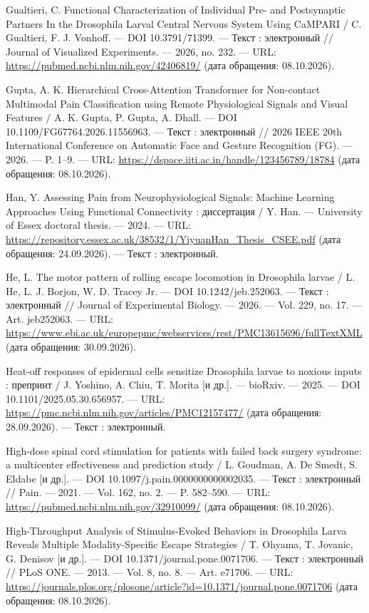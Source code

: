 \begin{list}{}{\setlength{\leftmargin}{10mm}\setlength{\labelwidth}{8mm}\setlength{\labelsep}{2mm}\setlength{\itemsep}{0pt}\setlength{\parsep}{0pt}\setlength{\topsep}{0pt}}
\item[143.] Gualtieri, C. Functional Characterization of Individual Pre- and Postsynaptic Partners In the Drosophila Larval Central Nervous System Using CaMPARI / C. Gualtieri, F. J. Vonhoff. — DOI 10.3791/71399. — Текст : электронный // Journal of Visualized Experiments. — 2026, no. 232. — URL: \url{https://pubmed.ncbi.nlm.nih.gov/42406819/} (дата обращения: 08.10.2026).
\item[144.] Gupta, A. K. Hierarchical Cross-Attention Transformer for Non-contact Multimodal Pain Classification using Remote Physiological Signals and Visual Features / A. K. Gupta, P. Gupta, A. Dhall. — DOI 10.1109/FG67764.2026.11556963. — Текст : электронный // 2026 IEEE 20th International Conference on Automatic Face and Gesture Recognition (FG). — 2026. — P. 1–9. — URL: \url{https://dspace.iiti.ac.in/handle/123456789/18784} (дата обращения: 08.10.2026).
\item[145.] Han, Y. Assessing Pain from Neurophysiological Signals: Machine Learning Approaches Using Functional Connectivity : диссертация / Y. Han. — University of Essex doctoral thesis. — 2024. — URL: \url{https://repository.essex.ac.uk/38532/1/YiyuanHan\_Thesis\_CSEE.pdf} (дата обращения: 24.09.2026). — Текст : электронный.
\item[146.] He, L. The motor pattern of rolling escape locomotion in Drosophila larvae / L. He, L. J. Borjon, W. D. Tracey Jr. — DOI 10.1242/jeb.252063. — Текст : электронный // Journal of Experimental Biology. — 2026. — Vol. 229, no. 17. — Art. jeb252063. — URL: \url{https://www.ebi.ac.uk/europepmc/webservices/rest/PMC13615696/fullTextXML} (дата обращения: 30.09.2026).
\item[147.] Heat-off responses of epidermal cells sensitize Drosophila larvae to noxious inputs : препринт / J. Yoshino, A. Chiu, T. Morita [и др.]. — bioRxiv. — 2025. — DOI 10.1101/2025.05.30.656957. — URL: \url{https://pmc.ncbi.nlm.nih.gov/articles/PMC12157477/} (дата обращения: 28.09.2026). — Текст : электронный.
\item[148.] High-dose spinal cord stimulation for patients with failed back surgery syndrome: a multicenter effectiveness and prediction study / L. Goudman, A. De Smedt, S. Eldabe [и др.]. — DOI 10.1097/j.pain.0000000000002035. — Текст : электронный // Pain. — 2021. — Vol. 162, no. 2. — P. 582–590. — URL: \url{https://pubmed.ncbi.nlm.nih.gov/32910099/} (дата обращения: 08.10.2026).
\item[149.] High-Throughput Analysis of Stimulus-Evoked Behaviors in Drosophila Larva Reveals Multiple Modality-Specific Escape Strategies / T. Ohyama, T. Jovanic, G. Denisov [и др.]. — DOI 10.1371/journal.pone.0071706. — Текст : электронный // PLoS ONE. — 2013. — Vol. 8, no. 8. — Art. e71706. — URL: \url{https://journals.plos.org/plosone/article?id=10.1371/journal.pone.0071706} (дата обращения: 08.10.2026).

\end{list}
